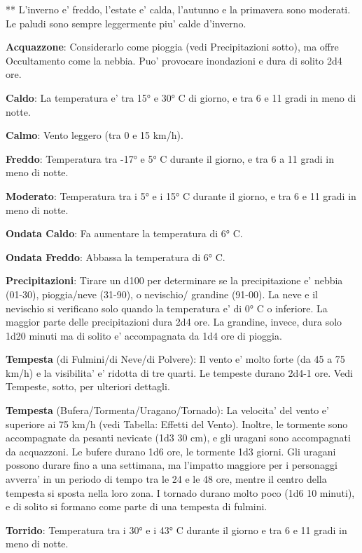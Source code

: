 \documentclass[a4paper,11pt,twoside,openany]{dndbook}
\begin{document}
{{*}{*} L'inverno e' freddo, l'estate e' calda, l'autunno e la primavera sono moderati. Le paludi sono sempre leggermente piu' calde d'inverno.

\bigskip

\textbf{Acquazzone}: Considerarlo come pioggia (vedi Precipitazioni sotto), ma offre Occultamento come la nebbia. Puo' provocare inondazioni e dura di solito 2d4 ore.

\textbf{Caldo}: La temperatura e' tra 15° e 30° C di giorno, e tra 6 e 11 gradi in meno di notte.

\textbf{Calmo}: Vento leggero (tra 0 e 15 km/h).

\textbf{Freddo}: Temperatura tra -17° e 5° C durante il giorno, e tra 6 a 11 gradi in meno di notte.

\textbf{Moderato}: Temperatura tra i 5° e i 15° C durante il giorno, e tra 6 e 11 gradi in meno di notte.

\textbf{Ondata Caldo}: Fa aumentare la temperatura di 6° C.

\textbf{Ondata Freddo}: Abbassa la temperatura di 6° C.

\textbf{Precipitazioni}: Tirare un d100 per determinare se la precipitazione e' nebbia (01-30), pioggia/neve (31-90), o nevischio/ grandine (91-00). La neve e il nevischio si verificano solo quando la temperatura e' di 0° C o inferiore. La maggior parte delle precipitazioni dura 2d4 ore. La grandine, invece, dura solo 1d20 minuti ma di solito e' accompagnata da 1d4 ore di pioggia.

\textbf{Tempesta} (di Fulmini/di Neve/di Polvere): Il vento e' molto forte (da 45 a 75 km/h) e la visibilita' e' ridotta di tre quarti. Le tempeste durano 2d4-1 ore. Vedi Tempeste, sotto, per ulteriori dettagli.

\textbf{Tempesta} (Bufera/Tormenta/Uragano/Tornado): La velocita' del vento e' superiore ai 75 km/h (vedi Tabella: Effetti del Vento). Inoltre, le tormente sono accompagnate da pesanti nevicate (1d3 \texttimes{} 30 cm), e gli uragani sono accompagnati da acquazzoni. Le bufere durano 1d6 ore, le tormente 1d3 giorni. Gli uragani possono durare fino a una settimana, ma l'impatto maggiore per i personaggi avverra' in un periodo di tempo tra le 24 e le 48 ore, mentre il centro della tempesta si sposta nella loro zona. I tornado durano molto poco (1d6 \texttimes{} 10 minuti), e di solito si formano come parte di una tempesta di fulmini.

\textbf{Torrido}: Temperatura tra i 30° e i 43° C durante il giorno e tra 6 e 11 gradi in meno di notte.

}
\end{document}
